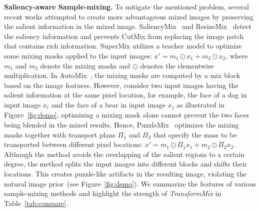 \documentclass[10pt]{article} %
\newcommand{\TMIX}[0]{\textit{TransformMix }}
\begin{document}
\textbf{Saliency-aware Sample-mixing.} To mitigate the mentioned problem, several recent works attempted to create more advantageous mixed images by preserving the salient information in the mixed image. SaliencyMix~\citep{smix} and ResizeMix~\citep{resizemix} detect the saliency information and prevents CutMix from replacing the image patch that contains rich information. SuperMix utilizes a teacher model to optimize some mixing masks applied to the input images: $x' = m_1 \odot x_1 + m_2 \odot x_2$, where $m_1$ and $m_2$ denote the mixing masks and $\odot$ denotes the elementwise multiplication. In AutoMix~\citep{automix}, the mixing masks are computed by a mix block based on the image features. However, consider two input images having the salient information at the same pixel location, for example, the face of a dog in input image $x_i$ and the face of a bear in input image $x_j$ as illustrated in Figure~\ref{fig:demo}, optimizing a mixing mask alone cannot prevent the two faces being blended in the mixed results. Hence, PuzzleMix~\citep{puzzlemix} optimizes the mixing masks together with transport plans $\Pi_1$ and $\Pi_2$ that specify the mass to be transported between different pixel locations: $x' = m_1 \odot \Pi_1 x_1 + m_2 \odot \Pi_2 x_2$. Although the method avoids the overlapping of the salient regions to a certain degree, the method splits the input images into different blocks and shifts their locations. This creates puzzle-like artifacts in the resulting image, violating the natural image prior~(see Figure~\ref{fig:demo}). We summarize the features of various sample-mixing methods and highlight the strength of \TMIX in Table~\ref{tab:compare}. 
\end{document}
